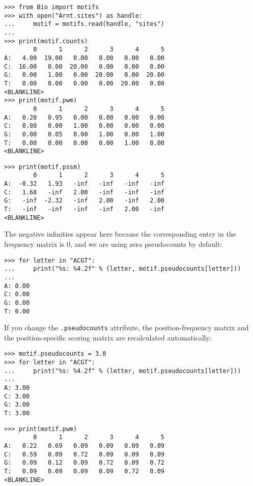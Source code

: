 \begin{verbatim}
>>> from Bio import motifs
>>> with open("Arnt.sites") as handle:
...     motif = motifs.read(handle, "sites")
...
>>> print(motif.counts)
        0      1      2      3      4      5
A:   4.00  19.00   0.00   0.00   0.00   0.00
C:  16.00   0.00  20.00   0.00   0.00   0.00
G:   0.00   1.00   0.00  20.00   0.00  20.00
T:   0.00   0.00   0.00   0.00  20.00   0.00
<BLANKLINE>
>>> print(motif.pwm)
        0      1      2      3      4      5
A:   0.20   0.95   0.00   0.00   0.00   0.00
C:   0.80   0.00   1.00   0.00   0.00   0.00
G:   0.00   0.05   0.00   1.00   0.00   1.00
T:   0.00   0.00   0.00   0.00   1.00   0.00
<BLANKLINE>
\end{verbatim}
\begin{verbatim}
>>> print(motif.pssm)
        0      1      2      3      4      5
A:  -0.32   1.93   -inf   -inf   -inf   -inf
C:   1.68   -inf   2.00   -inf   -inf   -inf
G:   -inf  -2.32   -inf   2.00   -inf   2.00
T:   -inf   -inf   -inf   -inf   2.00   -inf
<BLANKLINE>
\end{verbatim}
The negative infinities appear here because the corresponding entry in the frequency matrix is 0, and we are using zero pseudocounts by default:

\begin{verbatim}
>>> for letter in "ACGT":
...     print("%s: %4.2f" % (letter, motif.pseudocounts[letter]))
...
A: 0.00
C: 0.00
G: 0.00
T: 0.00
\end{verbatim}
If you change the \verb+.pseudocounts+ attribute, the position-frequency matrix and the position-specific scoring matrix are recalculated automatically:

\begin{verbatim}
>>> motif.pseudocounts = 3.0
>>> for letter in "ACGT":
...     print("%s: %4.2f" % (letter, motif.pseudocounts[letter]))
...
A: 3.00
C: 3.00
G: 3.00
T: 3.00
\end{verbatim}
\begin{verbatim}
>>> print(motif.pwm)
        0      1      2      3      4      5
A:   0.22   0.69   0.09   0.09   0.09   0.09
C:   0.59   0.09   0.72   0.09   0.09   0.09
G:   0.09   0.12   0.09   0.72   0.09   0.72
T:   0.09   0.09   0.09   0.09   0.72   0.09
<BLANKLINE>
\end{verbatim}

